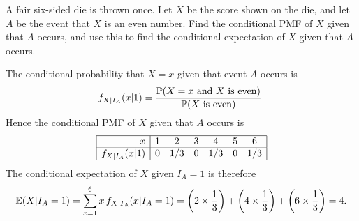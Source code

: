 \begin{exercise}
\begin{questions}

\question
A fair six-sided die is thrown once. Let $X$ be the score shown on the die, and let $A$ be the event that $X$ is an even number. Find the conditional PMF of $X$ given that $A$ occurs, and use this to find the conditional expectation of $X$ given that $A$ occurs.
\begin{answer}
The conditional probability that $X=x$ given that event $A$ occurs is
\[
f_{X|I_A}(x|1) = \frac{\mathbb{P}(X=x\text{ and $X$ is even})}{\mathbb{P}(X\text{ is even})}.
\]
Hence the conditional PMF of $X$ given that $A$ occurs is 
\[
\begin{array}{|r|cccccc|}\hline
x       			& 1     & 2     & 3     & 4     & 5     & 6    \\ \hline
f_{X|I_A}(x|1)		& 0     & 1/3   & 0     & 1/3   & 0     & 1/3  \\ \hline
\end{array}
\]
The conditional expectation of $X$ given $I_A=1$ is therefore
\[
\mathbb{E}(X|I_A=1) = \sum_{x=1}^6 x \, f_{X|I_A}(x|I_A=1) = \left(2\times\frac{1}{3}\right) + \left(4\times\frac{1}{3}\right) + \left(6\times\frac{1}{3}\right) = 4.
\]
\end{answer}



\end{questions}
\end{exercise}
